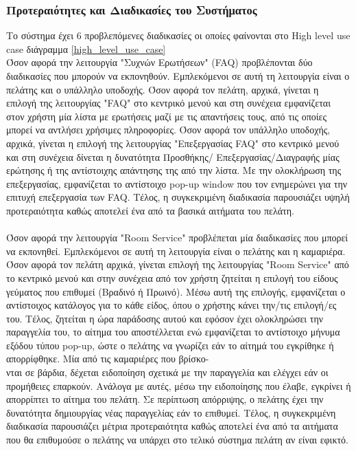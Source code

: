\subsubsection{Προτεραιότητες και Διαδικασίες του Συστήματος}
Το σύστημα έχει 6 προβλεπόμενες διαδικασίες οι οποίες φαίνονται στο  High level use case 
διάγραμμα \ref{high_level_use_case}  \\

\noindent
Όσον αφορά την λειτουργία "Συχνών Ερωτήσεων" (FAQ) προβλέπονται δύο διαδικασίες που μπορούν να 
εκπονηθούν. Εμπλεκόμενοι σε αυτή τη λειτουργία είναι ο πελάτης και ο υπάλληλο υποδοχής. Όσον αφορά 
τον πελάτη, αρχικά, γίνεται η επιλογή της λειτουργίας "FAQ" στο κεντρικό μενού και στη συνέχεια 
εμφανίζεται στον χρήστη μία λίστα με ερωτήσεις μαζί με τις απαντήσεις τους, από τις οποίες μπορεί να 
αντλήσει χρήσιμες πληροφορίες. Όσον αφορά τον υπάλληλο υποδοχής, αρχικά, γίνεται η επιλογή της 
λειτουργίας "Επεξεργασίας FAQ" στο κεντρικό μενού και στη συνέχεια δίνεται η δυνατότητα Προσθήκης/
Επεξεργασίας/Διαγραφής μίας ερώτησης ή της αντίστοιχης απάντησης της από την λίστα. Με την 
ολοκλήρωση  της επεξεργασίας, εμφανίζεται το αντίστοιχο  pop-up window που τον ενημερώνει για 
την επιτυχή επεξεργασία των FAQ. Τέλος, η συγκεκριμένη διαδικασία παρουσιάζει υψηλή προτεραιότητα
καθώς αποτελεί ένα από τα βασικά αιτήματα του πελάτη.\\ \\


\noindent 
Όσον αφορά την λειτουργία "Room Service" προβλέπεται μία διαδικασίες που μπορεί να εκπονηθεί.
Εμπλεκόμενοι σε αυτή τη λειτουργία είναι ο πελάτης και η καμαριέρα. Όσον αφορά τον πελάτη αρχικά,
γίνεται επιλογή της λειτουργίας "Room Service" από το κεντρικό μενού και στην συνέχεια από τον χρήστη
ζητείται η επιλογή του είδους γεύματος που επιθυμεί (Βραδινό ή Πρωινό). Μέσω αυτή της επιλογής, 
εμφανίζεται ο αντίστοιχος κατάλογος για το κάθε είδος, όπου ο χρήστης κάνει την/τις  επιλογή/ες του. 
Τέλος,  ζητείται η ώρα παράδοσης αυτού και εφόσον έχει ολοκληρώσει την παραγγελία του, το αίτημα 
του αποστέλλεται ενώ εμφανίζεται το αντίστοιχο μήνυμα εξόδου τύπου pop-up, ώστε ο πελάτης να 
γνωρίζει εάν το αίτημά του εγκρίθηκε ή απορρίφθηκε.  Μία από τις καμαριέρες που βρίσκο-\\νται σε 
βάρδια, δέχεται ειδοποίηση σχετικά με την παραγγελία και ελέγχει εάν οι προμήθειες επαρκούν. 
Ανάλογα με αυτές, μέσω την ειδοποίησης που έλαβε, εγκρίνει ή απορρίπτει το αίτημα του πελάτη. Σε  
περίπτωση απόρριψης, ο πελάτης έχει την δυνατότητα δημιουργίας νέας παραγγελίας εάν το επιθυμεί.
Τέλος, η συγκεκριμένη διαδικασία παρουσιάζει μέτρια προτεραιότητα καθώς αποτελεί ένα από τα 
αιτήματα που θα επιθυμούσε ο πελάτης να υπάρχει στο τελικό σύστημα πελάτη αν είναι εφικτό.\\ \\

